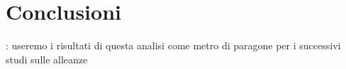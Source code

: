 \chapter{Conclusioni}
\blindtext

: useremo i risultati di questa analisi come metro di paragone per i successivi studi sulle alleanze